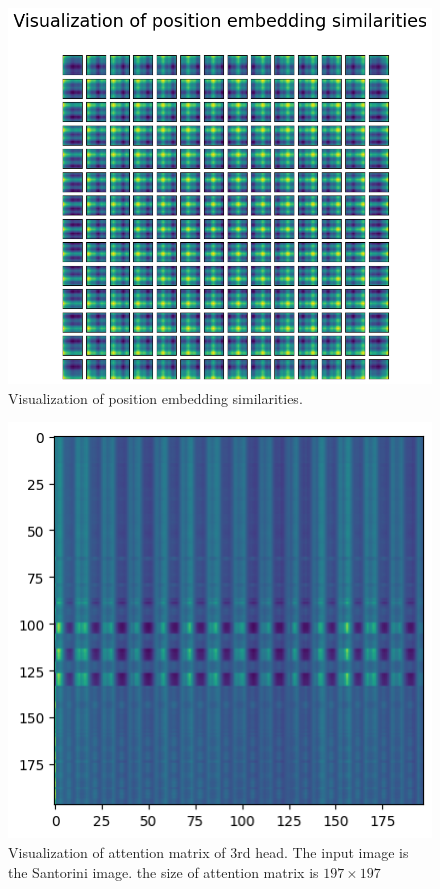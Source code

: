\documentclass[extendedabs]{bmvc2k}
\begin{document}
\begin{figure}[t]
\centering
	\includegraphics[width=\linewidth]{images/fig5.png}
	\caption{
		Visualization of position embedding similarities.}
	\vspace{-2mm}
        \label{posembedsimilar}
\end{figure}

\begin{figure}[t]
\centering
	\includegraphics[width=0.7\linewidth]{images/fig6.png}
	\caption{
		Visualization of attention matrix of 3rd head. The input image is the Santorini image. the size of attention matrix is $197\times197$}
	\vspace{-2mm}
        \label{fig:attentionvis1}
\end{figure}
\end{document}
